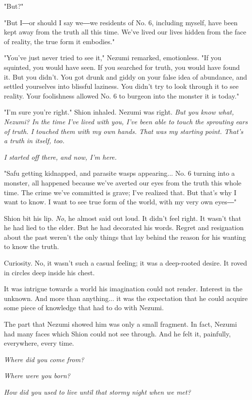 "But?"

"But I―or should I say we―we residents of No. 6, including myself, have
been kept away from the truth all this time. We've lived our lives
hidden from the face of reality, the true form it embodies."

"You've just never tried to see it," Nezumi remarked, emotionless. "If
you squinted, you would have seen. If you searched for truth, you would
have found it. But you didn't. You got drunk and giddy on your false
idea of abundance, and settled yourselves into blissful laziness. You
didn't try to look through it to see reality. Your foolishness allowed
No. 6 to burgeon into the monster it is today."

"I'm sure you're right." Shion inhaled. Nezumi was right. \emph{But you know
	what, Nezumi? In the time I've lived with you, I've been able to touch
	the sprouting ears of truth. I touched them with my own hands. That was
	my starting point. That's a truth in itself, too.}

\emph{I started off there, and now, I'm here.}

"Safu getting kidnapped, and parasite wasps appearing... No. 6 turning
into a monster, all happened because we've averted our eyes from the
truth this whole time. The crime we've committed is grave; I've realized
that. But that's why I want to know. I want to see true form of the
world, with my very own eyes―"

Shion bit his lip. \emph{No}, he almost said out loud. It didn't feel right. It
wasn't that he had lied to the elder. But he had decorated his words.
Regret and resignation about the past weren't the only things that lay
behind the reason for his wanting to know the truth.

Curiosity. No, it wasn't such a casual feeling; it was a deep-rooted
desire. It roved in circles deep inside his chest.

It was intrigue towards a world his imagination could not render.
Interest in the unknown. And more than anything... it was the
expectation that he could acquire some piece of knowledge that had to do
with Nezumi.

The part that Nezumi showed him was only a small fragment. In fact,
Nezumi had many faces which Shion could not see through. And he felt it,
painfully, everywhere, every time.

\emph{Where did you come from?}

\emph{Where were you born?}

\emph{How did you used to live until that stormy night when we met?}

